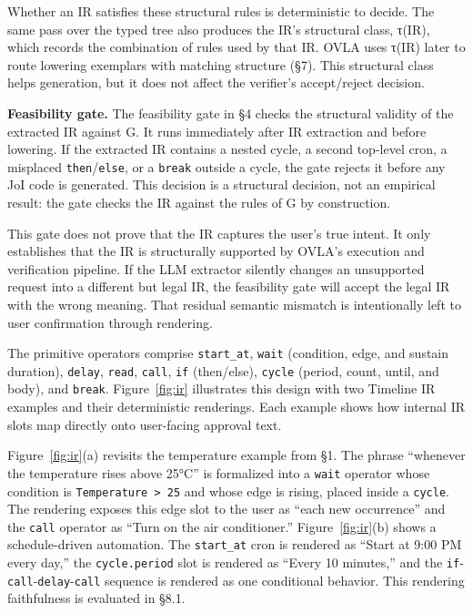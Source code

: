 \documentclass[sigconf,nonacm,anonymous,review]{acmart}
\begin{document}
Whether an IR satisfies these structural rules is deterministic to decide. The same pass over the typed tree also produces the IR's structural class, τ(IR), which records the combination of rules used by that IR. OVLA uses τ(IR) later to route lowering exemplars with matching structure (\S7). This structural class helps generation, but it does not affect the verifier's accept/reject decision.

\textbf{Feasibility gate.} The feasibility gate in \S4 checks the structural validity of the extracted IR against G. It runs immediately after IR extraction and before lowering. If the extracted IR contains a nested cycle, a second top-level cron, a misplaced \texttt{then}/\texttt{else}, or a \texttt{break} outside a cycle, the gate rejects it before any JoI code is generated. This decision is a structural decision, not an empirical result: the gate checks the IR against the rules of G by construction.

This gate does not prove that the IR captures the user's true intent. It only establishes that the IR is structurally supported by OVLA's execution and verification pipeline. If the LLM extractor silently changes an unsupported request into a different but legal IR, the feasibility gate will accept the legal IR with the wrong meaning. That residual semantic mismatch is intentionally left to user confirmation through rendering. %

The primitive operators comprise \texttt{start\_at}, \texttt{wait} (condition, edge, and sustain duration), \texttt{delay}, \texttt{read}, \texttt{call}, \texttt{if} (then/else), \texttt{cycle} (period, count, until, and body), and \texttt{break}. Figure~\ref{fig:ir} illustrates this design with two Timeline IR examples and their deterministic renderings. Each example shows how internal IR slots map directly onto user-facing approval text.

Figure~\ref{fig:ir}(a) revisits the temperature example from \S1. The phrase ``whenever the temperature rises above 25°C'' is formalized into a \texttt{wait} operator whose condition is \texttt{Temperature > 25} and whose edge is rising, placed inside a \texttt{cycle}. The rendering exposes this edge slot to the user as ``each new occurrence'' and the \texttt{call} operator as ``Turn on the air conditioner.'' Figure~\ref{fig:ir}(b) shows a schedule-driven automation. The \texttt{start\_at} cron is rendered as ``Start at 9:00 PM every day,'' the \texttt{cycle.period} slot is rendered as ``Every 10 minutes,'' and the \texttt{if}-\texttt{call}-\texttt{delay}-\texttt{call} sequence is rendered as one conditional behavior. This rendering faithfulness is evaluated in \S8.1.
\end{document}
